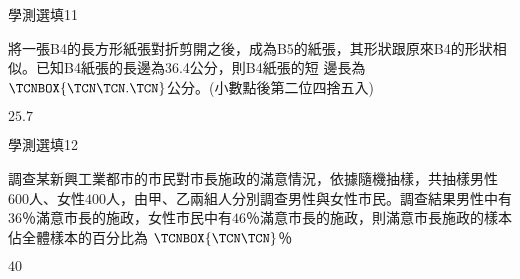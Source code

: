 \begin{QUESTIONS}
    \begin{QUESTION}
        \begin{ExamInfo}{90}{學測}{選填}{11}
        \end{ExamInfo}
        \begin{ExamAnsRateInfo}{}{}{}{}
        \end{ExamAnsRateInfo}
        \begin{QBODY}
		將一張B4的長方形紙張對折剪開之後，成為B5的紙張，其形狀跟原來B4的形狀相似。已知B4紙張的長邊為36.4公分，則B4紙張的短
邊長為$\TCNBOX{\TCN\TCN .\TCN}$公分。(小數點後第二位四捨五入)

        \end{QBODY}
        \begin{QFROMS}
        \end{QFROMS}
        \begin{QTAGS}\end{QTAGS}
        \begin{QANS}
            $25.7$
        \end{QANS}
        \begin{QSOLLIST}
        \end{QSOLLIST}
        \begin{QEMPTYSPACE}
        \end{QEMPTYSPACE}
    \end{QUESTION}
    \begin{QUESTION}
        \begin{ExamInfo}{90}{學測}{選填}{12}
        \end{ExamInfo}
        \begin{ExamAnsRateInfo}{}{}{}{}
        \end{ExamAnsRateInfo}
        \begin{QBODY}
			調查某新興工業都市的市民對市長施政的滿意情況，依據隨機抽樣，共抽樣男性$600$人、女性$400$人，由甲、乙兩組人分別調查男性與女性市民。調查結果男性中有$36$％滿意市長的施政，女性市民中有$46$％滿意市長的施政，則滿意市長施政的樣本佔全體樣本的百分比為
        $\TCNBOX{\TCN\TCN}$％
        \end{QBODY}
        \begin{QFROMS}
        \end{QFROMS}
        \begin{QTAGS}\end{QTAGS}
        \begin{QANS}
            $40$
        \end{QANS}
        \begin{QSOLLIST}

\end{QSOLLIST}
\end{QUESTION}
\end{QUESTIONS}
